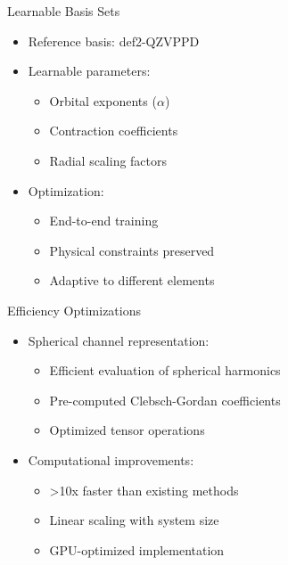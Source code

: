 \begin{frame}{Learnable Basis Sets}
    \begin{itemize}
        \item Reference basis: def2-QZVPPD
        \item Learnable parameters:
        \begin{itemize}
            \item Orbital exponents ($\alpha$)
            \item Contraction coefficients
            \item Radial scaling factors
        \end{itemize}
        \item Optimization:
        \begin{itemize}
            \item End-to-end training
            \item Physical constraints preserved
            \item Adaptive to different elements
        \end{itemize}
    \end{itemize}
\end{frame}

\begin{frame}{Efficiency Optimizations}
    \begin{itemize}
        \item Spherical channel representation:
        \begin{itemize}
            \item Efficient evaluation of spherical harmonics
            \item Pre-computed Clebsch-Gordan coefficients
            \item Optimized tensor operations
        \end{itemize}
        \item Computational improvements:
        \begin{itemize}
            \item >10x faster than existing methods
            \item Linear scaling with system size
            \item GPU-optimized implementation
        \end{itemize}
    \end{itemize}
\end{frame}

